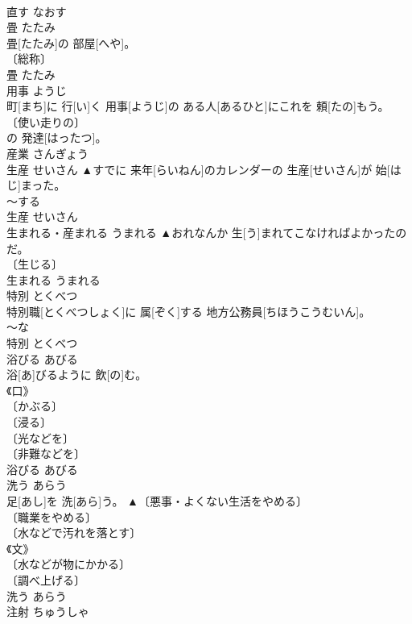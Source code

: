 \documentclass[8pt]{extreport}
\begin{document}
\begin{CJK}{UTF8}{min}
\\	直す	なおす	
\\	畳	たたみ	
\\	畳[たたみ]の 部屋[へや]。	
\\	〔総称〕 
\\	畳	たたみ	
\\	用事	ようじ	
\\	町[まち]に 行[い]く 用事[ようじ]の ある人[あるひと]にこれを 頼[たの]もう。	
\\	〔使い走りの〕 
\\	[＝よう２ 
\\	用事	ようじ	
\\	産業	さんぎょう	
\\	産業[さんぎょう]の 発達[はったつ]。	
\\	産業	さんぎょう	
\\	生産	せいさん	▲すでに 来年[らいねん]のカレンダーの 生産[せいさん]が 始[はじ]まった。	
\\	～する 
\\	生産	せいさん	
\\	生まれる・産まれる	うまれる	▲おれなんか 生[う]まれてこなければよかったのだ。	
\\	〔生じる〕 
\\	生まれる	うまれる	
\\	特別	とくべつ	
\\	特別職[とくべつしょく]に 属[ぞく]する 地方公務員[ちほうこうむいん]。	
\\	～な 
\\	特別	とくべつ	
\\	浴びる	あびる	
\\	浴[あ]びるように 飲[の]む。	
\\	《口》 
\\	〔かぶる〕 
\\	〔浸る〕 
\\	〔光などを〕 
\\	〔非難などを〕 
\\	浴びる	あびる	
\\	洗う	あらう	
\\	足[あし]を 洗[あら]う。	▲〔悪事・よくない生活をやめる〕 
\\	〔職業をやめる〕 
\\	〔水などで汚れを落とす〕 
\\	《文》 
\\	〔水などが物にかかる〕 
\\	〔調べ上げる〕 
\\	洗う	あらう	
\\	注射	ちゅうしゃ	

\end{CJK}
\end{document}
